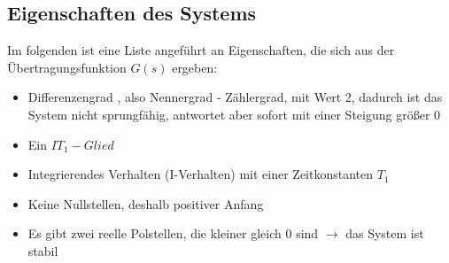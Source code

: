 \subsection{Eigenschaften des Systems}

Im folgenden ist eine Liste angeführt an Eigenschaften, die sich aus der Übertragungsfunktion $G(s)$ ergeben:
\begin{itemize}
	\item Differenzengrad , also Nennergrad - Zählergrad, mit Wert 2, dadurch ist das System nicht sprungfähig, antwortet aber sofort mit einer Steigung größer 0
	\item Ein $IT_1-Glied$
	\item Integrierendes Verhalten (I-Verhalten) mit einer Zeitkonstanten $T_1$
	\item Keine Nullstellen, deshalb positiver Anfang
	\item Es gibt zwei reelle Polstellen, die kleiner gleich 0 sind $\rightarrow$ das System ist stabil
\end{itemize}